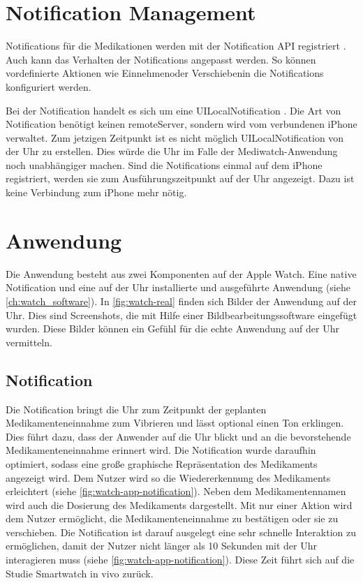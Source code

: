 \section{Notification Management}
Notifications für die Medikationen werden mit der Notification API  registriert \cite{Apple:2015notif}. Auch kann das Verhalten der Notifications angepasst werden. So können vordefinierte Aktionen wie \glqq Einnehmen\grqq  oder \glqq Verschieben\grqq in die Notifications konfiguriert werden.

Bei der Notification handelt es sich um eine UILocalNotification \cite{Apple:2015notif}. Die Art von Notification benötigt keinen \gls{remoteServer}, sondern wird vom verbundenen iPhone verwaltet. Zum jetzigen Zeitpunkt ist es nicht möglich UILocalNotification von der Uhr zu erstellen. Dies würde die Uhr im Falle der Mediwatch-Anwendung noch unabhängiger machen. Sind die Notifications einmal auf dem iPhone registriert, werden sie zum Ausführungszeitpunkt auf der Uhr angezeigt. Dazu ist keine Verbindung zum iPhone mehr nötig.

\section{Anwendung}

Die Anwendung besteht aus zwei Komponenten auf der Apple Watch. Eine native Notification  und eine auf der Uhr installierte und ausgeführte Anwendung (siehe \ref{ch:watch_software}). In \ref{fig:watch-real} finden sich Bilder der Anwendung auf der Uhr. Dies sind Screenshots, die mit Hilfe einer Bildbearbeitungssoftware eingefügt wurden. Diese Bilder können ein Gefühl für die echte Anwendung auf der Uhr vermitteln.

\subsection{Notification}
 Die Notification bringt die Uhr zum Zeitpunkt der geplanten Medikamenteneinnahme zum Vibrieren und lässt optional einen Ton erklingen. Dies führt dazu, dass der Anwender auf die Uhr blickt und an die bevorstehende Medikamenteneinnahme erinnert wird. Die Notification wurde daraufhin optimiert, sodass eine große graphische Repräsentation des Medikaments angezeigt wird. Dem Nutzer wird so die Wiedererkennung des Medikaments erleichtert (siehe \ref{fig:watch-app-notification}). Neben dem Medikamentennamen wird auch die Dosierung des Medikaments dargestellt. Mit nur einer Aktion wird dem Nutzer ermöglicht, die Medikamenteneinnahme zu bestätigen oder sie zu verschieben. Die Notification ist darauf ausgelegt eine sehr schnelle Interaktion zu ermöglichen, damit der Nutzer nicht länger als 10 Sekunden mit der Uhr interagieren muss (siehe \ref{fig:watch-app-notification}). Diese Zeit führt sich auf die Studie \glqq Smartwatch in vivo\glqq \cite{Pizza:2016} zurück.
 
